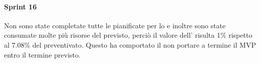 \paragraph{Sprint 16}
Non sono state completate tutte le  pianificate per lo  e inoltre sono state consumate molte più risorse del previsto, perciò il valore dell' risulta 1\% rispetto al 7.08\% del  preventivato.
Questo ha comportato il non portare a termine il MVP entro il termine previsto.
